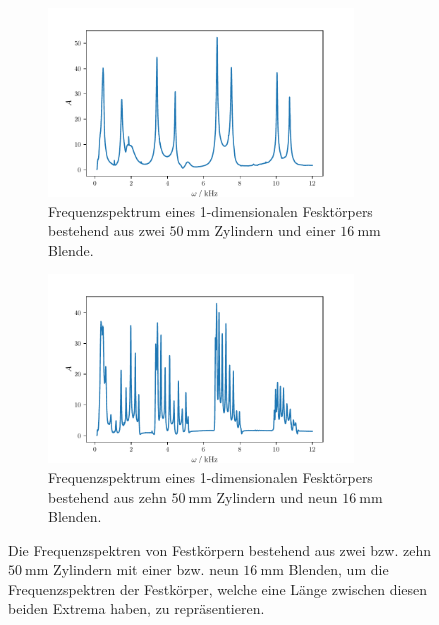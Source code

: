 \begin{figure}
    \begin{subfigure}{0.48\textwidth}%
    \centering%
    \includegraphics[height=5cm]{build/2c1b16.pdf}%
    \caption{Frequenzspektrum eines 1-dimensionalen Fesktörpers bestehend aus zwei $\qty{50}{\milli\meter}$ Zylindern und einer $\qty{16}{\milli\meter}$ Blende.}%
    \label{fig:2c1b16}%
    \end{subfigure}%
    \hfill%
    \begin{subfigure}{0.48\textwidth}%
    \centering%
    \includegraphics[height=5cm]{build/10c9b16.pdf}%
    \caption{Frequenzspektrum eines 1-dimensionalen Fesktörpers bestehend aus zehn $\qty{50}{\milli\meter}$ Zylindern und neun $\qty{16}{\milli\meter}$ Blenden.}%
    \label{fig:2c1b16}%
    \end{subfigure}%
    \caption{Die Frequenzspektren von Festkörpern bestehend aus zwei bzw. zehn $\qty{50}{\milli\meter}$ Zylindern mit einer bzw. neun $\qty{16}{\milli\meter}$ Blenden, um die 
    Frequenzspektren der Festkörper, welche eine Länge zwischen diesen beiden Extrema haben, zu repräsentieren.}%
    \label{fig:16mm}
\end{figure}%
